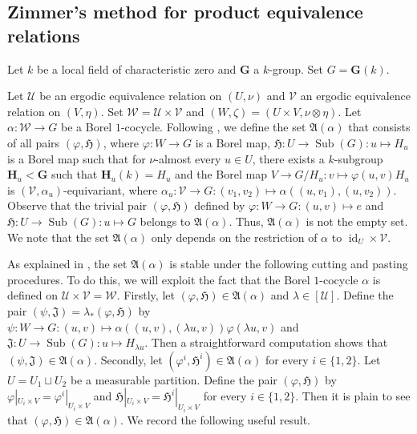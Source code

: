 \documentclass[11pt]{amsart}
\numberwithin{equation}{section}
\theoremstyle{plain}
\theoremstyle{definition}
\newcommand{\id}{\operatorname{id}}
\newcommand{\Sub}{\operatorname{Sub}}
\begin{document}
\subsection{Zimmer's method for product equivalence relations}

Let $k$ be a local field of characteristic zero and $\mathbf G$ a $k$-group. Set $G = \mathbf G(k)$. 

Let $\mathscr U$ be an ergodic equivalence relation on $(U, \nu)$ and $\mathscr V$ an ergodic equivalence relation on $(V, \eta)$. Set $\mathscr W = \mathscr U \times \mathscr V$ and $(W, \zeta) = (U \times V, \nu \otimes \eta)$. Let $\alpha : \mathscr W \to G$ be a Borel $1$-cocycle. Following \cite{Zi81}, we define the set $\mathfrak A(\alpha)$ that consists of all pairs $(\varphi, \mathfrak H)$, where $\varphi : W \to G$ is a Borel map, $\mathfrak H : U \to \Sub(G) : u \mapsto H_u$ is a Borel map such that for $\nu$-almost every $u \in U$, there exists a $k$-subgroup $\mathbf H_u < \mathbf G$ such that $\mathbf H_u(k) = H_u$ and the Borel map $V \to G/H_u : v \mapsto \varphi(u, v)H_u$ is $(\mathscr V, \alpha_u)$-equivariant, where $\alpha_u : \mathscr V \to G : (v_1, v_2) \mapsto \alpha((u, v_1), (u, v_2))$. Observe that the trivial pair $(\varphi, \mathfrak H)$ defined by $\varphi : W \to G : (u, v) \mapsto e$ and $\mathfrak H : U \to \Sub(G) : u \mapsto G$ belongs to $\mathfrak A(\alpha)$. Thus, $\mathfrak A(\alpha)$ is not the empty set. We note that the set $\mathfrak A(\alpha)$ only depends on the restriction of $\alpha$ to $\id_U \times \mathscr V$.

As explained in \cite{Zi81}, the set $\mathfrak A(\alpha)$ is stable under the following cutting and pasting procedures. To do this, we will exploit the fact that the Borel $1$-cocycle $\alpha$ is defined on $\mathscr U \times \mathscr V = \mathscr W$. Firstly, let $(\varphi, \mathfrak H) \in \mathfrak A(\alpha)$ and $\lambda \in [\mathscr U]$. Define the pair $(\psi, \mathfrak J) = \lambda_\ast(\varphi, \mathfrak H)$ by $\psi : W \to G : (u, v) \mapsto \alpha((u, v), (\lambda u, v))\varphi(\lambda u, v)$ and $\mathfrak J : U \to \Sub(G) : u \mapsto H_{\lambda u}$. Then a straightforward computation shows that $(\psi, \mathfrak J) \in \mathfrak A(\alpha)$. Secondly, let $(\varphi^i, \mathfrak H^i) \in \mathfrak A(\alpha)$ for every $i \in \{1, 2\}$. Let $U = U_1 \sqcup U_2$ be a measurable partition. Define the pair $(\varphi, \mathfrak H)$ by $\varphi|_{U_i \times V} = \varphi^i|_{U_i \times V}$ and $\mathfrak H|_{U_i \times V} = \mathfrak H^i|_{U_i \times V}$ for every $i \in \{1, 2\}$. Then it is plain to see that $(\varphi, \mathfrak H) \in \mathfrak A(\alpha)$. We record the following useful result.
\end{document}
